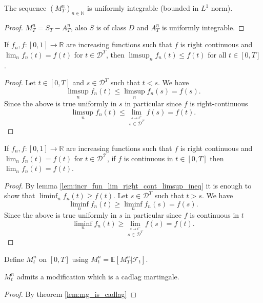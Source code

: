 \begin{lemma}\label{lem:M_uniform_integrabl}
  The sequence $(M^n_T)_{n\in\mathbb{N}}$ is uniformly integrable (bounded in $L^1$ norm).
\end{lemma}
\begin{proof}
  $M^n_T=S_T-A^n_T$, also $S$ is of class $D$ and $A^n_T$ is uniformly integrable.
\end{proof}

\begin{lemma}\label{lem:incr_fun_lim_right_cont_limsup_ineq}
  If $f_n, f : [0, 1] \rightarrow \mathbb{R}$ are increasing functions such that $f$ is right continuous and
  $\lim_n f_n(t) = f (t)$ for $t \in\mathcal{D}^T$, then  $\limsup_n  f_n(t) \leq f (t)$ for all $t \in [0, T]$.
\end{lemma}
\begin{proof}
  Let $t\in[0,T]$ and $s\in\mathcal{D}^T$ such that $t<s$. We have
  $$
  \limsup_n f_n(t)\leq \limsup_n f_n(s)=f(s).
  $$
  Since the above is true uniformly in $s$ in particular since $f$ is right-continuous
  $$
  \limsup_n f_n(t)\leq\lim_{\stackrel{s\rightarrow t^+}{s\in\mathcal{D}^T}}f(s)=f(t).
  $$
\end{proof}

\begin{lemma}\label{lem:incr_fun_lim_right_cont_lim_eq}
  If $f_n, f : [0, 1] \rightarrow \mathbb{R}$ are increasing functions such that $f$ is right continuous and
  $\lim_n f_n(t) = f (t)$ for $t \in\mathcal{D^T}$, if $f$ is continuous in $t\in[0,T]$ then $\lim_n  f_n(t) = f (t)$.
\end{lemma}
\begin{proof}
  By lemma \ref{lem:incr_fun_lim_right_cont_limsup_ineq} it is enough to show that $\liminf_n f_n(t)\geq f(t)$.
  Let $s\in\mathcal{D}^T$ such that $t>s$. We have
  $$
  \liminf_n f_n(t)\geq \liminf_n f_n(s)=f(s).
  $$
  Since the above is true uniformly in $s$ in particular since $f$ is continuous in $t$
  $$
  \liminf_n f_n(t)\geq\lim_{\stackrel{s\rightarrow t^-}{s\in\mathcal{D}^T}}f(s)=f(t).
$$
\end{proof}

Define $M^n_t$ on $[0,T]$ using $M^n_t=\mathbb{E}[M^n_T\vert\mathcal{F}_t]$.

\begin{lemma}\label{lem:M_n_cadlag_mg}
  $M^n_t$ admits a modification which is a cadlag martingale.
\end{lemma}
\begin{proof}
  By theorem \ref{lem:mg_is_cadlag}
\end{proof}

